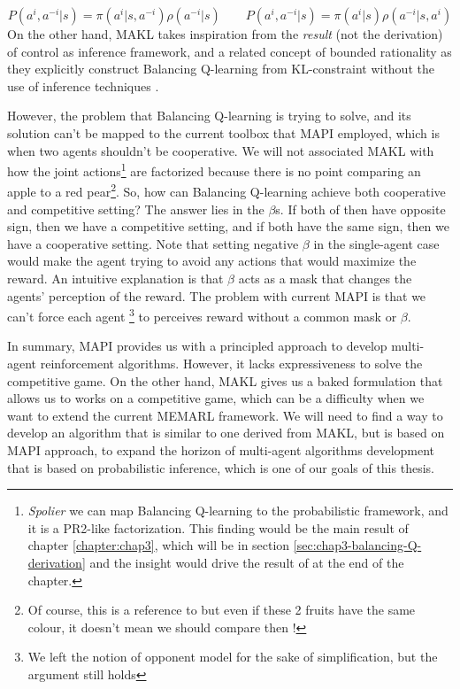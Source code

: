 \begin{equation}
\label{eqn:chap1-factorize-PR2-ROMMEO}
    P(a^{i}, a^{-i} | s) = \pi(a^{i} | s, a^{-i}) \rho(a^{-i} | s) \qquad P(a^{i}, a^{-i} | s) = \pi(a^{i} | s) \rho(a^{-i} | s, a^{i})
\end{equation}
On the other hand, MAKL takes inspiration from the \textit{result} (not the derivation) of control as inference framework, and a related concept of bounded rationality as they explicitly construct Balancing Q-learning from KL-constraint without the use of inference techniques \cite{grau2018balancing}. 

However, the problem that Balancing Q-learning is trying to solve, and its solution can't be mapped to the current toolbox that MAPI employed, which is when two agents shouldn't be cooperative. We will not associated MAKL with how the joint actions\footnote{\textit{Spolier} we can map Balancing Q-learning to the probabilistic framework, and it is a PR2-like factorization. This finding would be the main result of chapter \ref{chapter:chap3}, which will be in section \ref{sec:chap3-balancing-Q-derivation} and the insight would drive the result of at the end of the chapter.} are factorized because there is no point comparing an apple to a red pear\footnote{Of course, this is a reference to  but even if these 2 fruits have the same colour, it doesn't mean we should compare then !}. So, how can Balancing Q-learning achieve both cooperative and competitive setting? The answer lies in the $\beta$s. If both of then have opposite sign, then we have a competitive setting, and if both have the same sign, then we have a cooperative setting. Note that setting negative $\beta$ in the single-agent case would make the agent trying to avoid any actions that would maximize the reward. An intuitive explanation is that $\beta$ acts as a mask that changes the agents' perception of the reward. The problem with current MAPI is that we can't force each agent \footnote{We left the notion of opponent model for the sake of simplification, but the argument still holds} to perceives reward without a common mask or $\beta$. 

In summary, MAPI provides us with a principled approach to develop multi-agent reinforcement algorithms. However, it lacks expressiveness to solve the competitive game. On the other hand, MAKL gives us a baked formulation that allows us to works on a competitive game, which can be a difficulty when we want to extend the current MEMARL framework. We will need to find a way to develop an algorithm that is similar to one derived from MAKL, but is based on MAPI approach, to expand the horizon of multi-agent algorithms development that is based on probabilistic inference, which is one of our goals of this thesis.

